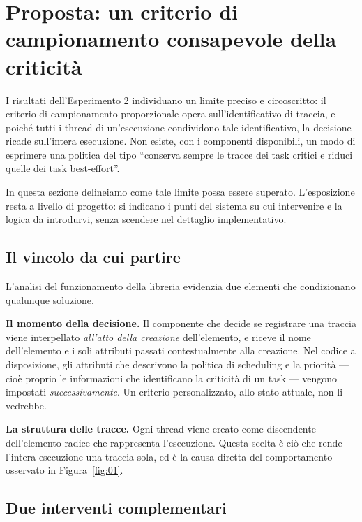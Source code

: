 \documentclass[11pt,a4paper]{article}
\begin{document}
\section{Proposta: un criterio di campionamento consapevole della criticit\`a}

I risultati dell'Esperimento 2 individuano un limite preciso e circoscritto: il criterio di
campionamento proporzionale opera sull'identificativo di traccia, e poich\'e tutti i thread di
un'esecuzione condividono tale identificativo, la decisione ricade sull'intera esecuzione. Non
esiste, con i componenti disponibili, un modo di esprimere una politica del tipo ``conserva sempre
le tracce dei task critici e riduci quelle dei task best-effort''.

In questa sezione delineiamo come tale limite possa essere superato. L'esposizione resta a livello
di progetto: si indicano i punti del sistema su cui intervenire e la logica da introdurvi, senza
scendere nel dettaglio implementativo.

\subsection{Il vincolo da cui partire}

L'analisi del funzionamento della libreria evidenzia due elementi che condizionano qualunque
soluzione.

\textbf{Il momento della decisione.} Il componente che decide se registrare una traccia viene
interpellato \emph{all'atto della creazione} dell'elemento, e riceve il nome dell'elemento e i soli
attributi passati contestualmente alla creazione. Nel codice a disposizione, gli attributi che
descrivono la politica di scheduling e la priorit\`a --- cio\`e proprio le informazioni che
identificano la criticit\`a di un task --- vengono impostati \emph{successivamente}. Un criterio
personalizzato, allo stato attuale, non li vedrebbe.

\textbf{La struttura delle tracce.} Ogni thread viene creato come discendente dell'elemento radice
che rappresenta l'esecuzione. Questa scelta \`e ci\`o che rende l'intera esecuzione una traccia sola,
ed \`e la causa diretta del comportamento osservato in Figura~\ref{fig:01}.

\subsection{Due interventi complementari}
\end{document}

